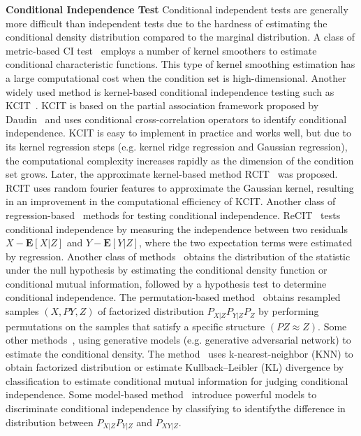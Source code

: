 \documentclass{article}
\begin{document}
\textbf{Conditional Independence Test} Conditional independent tests are generally more difficult than independent tests due to the hardness of estimating the conditional density distribution compared to the marginal distribution. A class of metric-based CI test~\citep{su2007consistent} employs a number of kernel smoothers to estimate conditional characteristic functions. This type of kernel smoothing estimation has a large computational cost when the condition set is high-dimensional.
Another widely used method is kernel-based conditional independence testing such as KCIT~\citep{zhang2011kernel,zhang2012kernel}. KCIT is based on the partial
association framework proposed by Daudin~\citep{daubechies1992ten} and uses conditional cross-correlation operators to identify conditional independence. KCIT is easy to implement in practice and works well, but due to its kernel regression steps (e.g. kernel ridge regression and Gaussian regression), the computational complexity increases rapidly as the dimension of the condition set grows. Later, the approximate kernel-based method RCIT~\citep{strobl2019approximate} was proposed. RCIT uses random fourier features to approximate the Gaussian kernel, resulting in an improvement in the computational efficiency of KCIT. Another class of regression-based~\citep{shah2020hardness,zhang2018measuring} methods for testing conditional independence. ReCIT~\citep{zhang2018measuring} tests conditional independence by measuring the independence between two residuals $X-\mathbf{E}[X|Z]$ and $Y-\mathbf{E}[Y|Z]$, where the two expectation terms were estimated by regression. Another class of methods~\citep{doran2014permutation,bellot2019conditional,shi2021double,runge2018conditional,sen2017model,mukherjee2020ccmi} obtains the distribution of the statistic under the null hypothesis by estimating the conditional density function or conditional mutual information, followed by a hypothesis test to determine conditional independence. The permutation-based method~\citep{doran2014permutation} obtains resampled samples $(X,PY,Z)$ of factorized distribution $P_{X|Z}P_{Y|Z}P_Z$ by performing permutations on the samples that satisfy a specific structure $(PZ\approx Z)$. Some other methods~\citep{bellot2019conditional,shi2021double}, using generative models (e.g. generative adversarial network) to estimate the conditional density. The method~\citep{runge2018conditional,mukherjee2020ccmi} uses k-nearest-neighbor (KNN) to obtain factorized distribution or estimate Kullback–Leibler (KL) divergence by classification to estimate conditional mutual information for judging conditional independence. Some model-based method~\citep{sen2017model} introduce powerful models to discriminate conditional independence by classifying to identifythe difference in distribution between $P_{X|Z}P_{Y|Z}$ and $P_{XY|Z}$.
\end{document}
